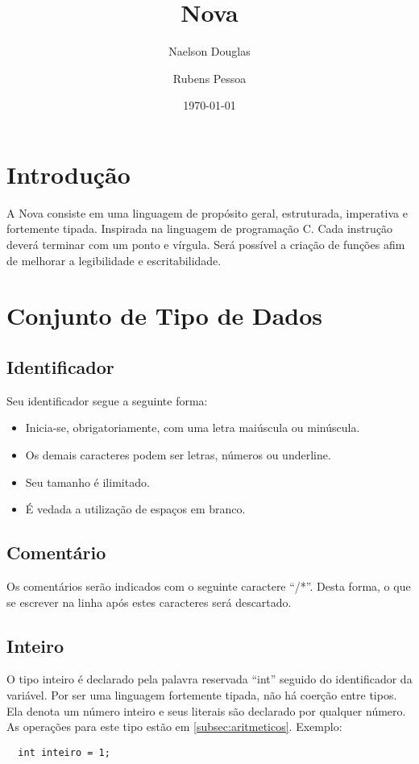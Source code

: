 \documentclass[a4paper, 12pt, article]{memoir}
\title{Nova}
\author{Naelson Douglas \and Rubens Pessoa}
\date{\today}
\begin{document}
\frontmatter
\begin{titlingpage}
  \maketitle
\end{titlingpage}

\tableofcontents

\mainmatter

\section{Introdução}
\label{sec:intro}
A Nova consiste em uma linguagem de propósito geral, estruturada, imperativa e fortemente tipada. Inspirada na linguagem de programação C. Cada instrução deverá terminar com um ponto e vírgula. Será possível a criação de funções afim de melhorar a legibilidade e escritabilidade. 

\section{Conjunto de Tipo de Dados}
\label{sec:conjunto}

\subsection{Identificador}
\label{subsec:id}
Seu identificador segue a seguinte forma:
\begin{itemize}
\item Inicia-se, obrigatoriamente, com uma letra maiúscula ou minúscula.
\item Os demais caracteres podem ser letras, números ou underline.
\item Seu tamanho é ilimitado.
\item É vedada a utilização de espaços em branco.
\end{itemize}

\subsection{Comentário}
\label{subsec:comentario}
Os comentários serão indicados com o seguinte caractere ``\//*''. Desta forma, o que se escrever na linha após estes caracteres será descartado.

\subsection{Inteiro}
\label{subsec:inteiro}
O tipo inteiro é declarado pela palavra reservada ``int'' seguido do identificador da
variável. Por ser uma linguagem fortemente tipada, não há coerção entre tipos. Ela denota um número inteiro e seus literais são declarado por qualquer número. As operações para este tipo estão em \ref{subsec:aritmeticos}. Exemplo:
\begin{lstlisting}
  int inteiro = 1;
\end{lstlisting}
\end{document}
